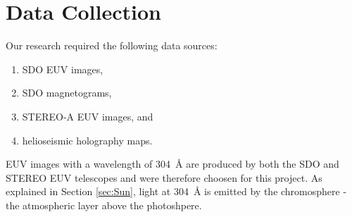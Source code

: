 \documentclass[11pt,a4paper,onecolumn]{report}
\begin{document}
  



\section{Data Collection}
\label{sec:data_collection}
Our research required the following data sources:
\begin{enumerate}
  \item SDO EUV images,
  \item SDO magnetograms,
  \item STEREO-A EUV images, and
  \item helioseismic holography maps.
\end{enumerate}
EUV images with a wavelength of \SI{304}{\angstrom} are produced by both the SDO
and STEREO EUV telescopes and were therefore choosen for this project. As explained in
Section \ref{sec:Sun}, light at \SI{304}{\angstrom} is emitted by the
chromosphere - the atmospheric layer above the photoshpere. \\
\end{document}
